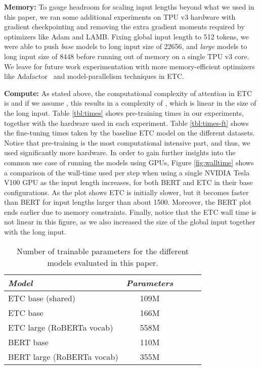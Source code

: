 \documentclass[11pt,a4paper]{article}
\begin{document}
{\bf Memory:} To gauge headroom for scaling input lengths beyond what we used in this paper, we ran some additional experiments on TPU v3 hardware with gradient checkpointing and removing the extra gradient moments required by optimizers like Adam and LAMB. Fixing global input length to 512 tokens, we were able to push {\em base} models to long input size of 22656, and {\em large} models to long input size of 8448 before running out of memory on a single TPU v3 core. We leave for future work experimentation with more memory-efficient optimizers like Adafactor~\cite{shazeer2018adafactor} and model-parallelism techniques in ETC.


{\bf Compute:} As stated above, the computational complexity of attention in ETC is  and if we assume , this results in a complexity of , which is linear in the size of the long input. Table \ref{tbl:times} shows pre-training times in our experiments, together with the hardware used in each experiment. Table \ref{tbl:times-ft} shows the fine-tuning times taken by the baseline ETC model on the different datasets. Notice that pre-training is the most computational intensive part, and thus, we used significantly more hardware. In order to gain further insights into the common use case of running the models using GPUs, Figure \ref{fig:walltime} shows a comparison of the wall-time used per step when using a single NVIDIA Tesla V100 GPU as the input length increases, for both BERT and ETC in their base configurations. As the plot shows ETC is initially slower, but it becomes faster than BERT for input lengths larger than about 1500. Moreover, the BERT plot ends earlier due to memory constraints. Finally, notice that the ETC wall time is not linear in this figure, as we also increased the size of the global input together with the long input.






\begin{table}[tb]\centering 
\begin{tabular}{lcccc} 
{\em Model} & {\em Parameters} \\ \hline
ETC base (shared)   &   109M \\
ETC base            &   166M \\
ETC large (RoBERTa vocab) &   558M  \\ \hline
BERT base                   &  110M  \\
BERT large (RoBERTa vocab)  &  355M  \\  
\end{tabular}							
\caption{Number of trainable parameters for the different models evaluated in this paper.}
\label{tbl:parameters} 
\end{table}
\end{document}
